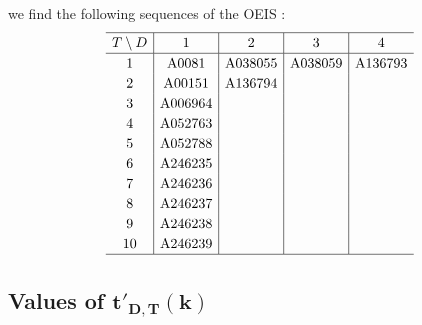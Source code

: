 \documentclass[10pt,a4paper]{amsart}
\numberwithin{equation}{section}
\begin{document}
we find the following sequences of the OEIS \cite{Sloane}:
\begin{gather*}
\setlength{\tabcolsep}{4.5pt}
\renewcommand{\arraystretch}{1.2}
\begin{tabular}{c|c|c|c|c}
\hline $T\setminus D$&1&2&3&4\\
\hline 1&A0081&A038055&A038059&A136793\\
2&A00151&A136794&\\
3&A006964&&\\
4&A052763&&\\
5&A052788&&\\
6&A246235&&\\
7&A246236&&\\
8&A246237&&\\
9&A246238&&\\
10&A246239&&\\
\hline
\end{tabular}\end{gather*}


\subsection[Values of t' D,T(k)]{Values of $\boldsymbol{t'_{D,T}(k)}$}
\end{document}
